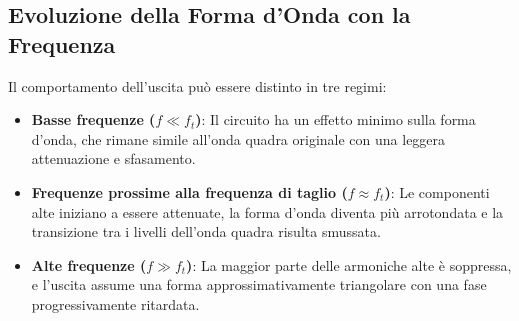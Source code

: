 \documentclass[10pt,a4paper]{article}
\begin{document}
\subsection{Evoluzione della Forma d’Onda con la Frequenza}

Il comportamento dell’uscita può essere distinto in tre regimi:

\begin{itemize}
    \item \textbf{Basse frequenze (\( f \ll f_t \))}: Il circuito ha un effetto minimo sulla forma d’onda, che rimane simile all’onda quadra originale con una leggera attenuazione e sfasamento.
    \item \textbf{Frequenze prossime alla frequenza di taglio (\( f \approx f_t \))}: Le componenti alte iniziano a essere attenuate, la forma d’onda diventa più arrotondata e la transizione tra i livelli dell’onda quadra risulta smussata.
    \item \textbf{Alte frequenze (\( f \gg f_t \))}: La maggior parte delle armoniche alte è soppressa, e l’uscita assume una forma approssimativamente triangolare con una fase progressivamente ritardata.
\end{itemize}
\end{document}
